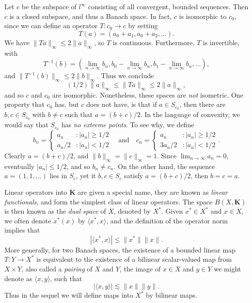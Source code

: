 \begin{example}
    Let $c$ be the subspace of $l^\infty$ consisting of all convergent, bounded sequences. Then $c$ is a closed subspace, and thus a Banach space. In fact, $c$ is isomorphic to $c_0$, since we can define an operator $T: c_0 \to c$ by setting
    \[ T(a) = (a_0 + a_1,a_0 + a_2,\dots). \]
    We have $\| T a \|_\infty \leq 2 \| a \|_\infty$, so $T$ is continuous. Furthermore, $T$ is invertible, with
    \[ T^{-1}(b) = \left( \lim_{n \to \infty} b_n, b_0 - \lim_{n \to \infty} b_n, b_1 - \lim_{n \to \infty} b_n, \dots \right), \]
    and $\| T^{-1}(b) \|_\infty \leq 2 \| b \|_\infty$. Thus we conclude
    \[ (1/2) \| a \|_\infty \leq \| Ta \|_\infty \leq 2 \| a \|_\infty, \]
    and so $c$ and $c_0$ are isomorphic. Nonetheless, these spaces are \emph{not} isometric. One property that $c_0$ has, but $c$ does not have, is that if $a \in S_{c_0}$, then there are $b, c \in S_{c_0}$ with $b \neq c$ such that $a = (b + c)/2$. In the language of convexity, we would say that $S_{c_0}$ has {\it no extreme points}. To see why, we define
    \[ b_n = \begin{cases} a_n &: |a_n| \geq 1/2 \\ a_n/2 &: |a_n| < 1/2 \end{cases}\quad\text{and}\quad c_n = \begin{cases} a_n &: |a_n| \geq 1/2 \\ 3a_n/2 &: |a_n| < 1/2 \end{cases}. \]
    Clearly $a = (b+c)/2$, and $\| b \|_\infty = \| c \|_\infty = 1$. Since $\lim_{n \to \infty} a_n = 0$, eventually $|a_n| \leq 1/2$, and so $b_n \neq c_n$. On the other hand, the sequence $a = (1,1,\dots)$ lies in $S_c$, yet it $b,c \in S_c$ satisfy $a = (b + c)/2$, then $b = c = a$.
\end{example}

Linear operators into $\mathbf{K}$ are given a special name, they are known as \emph{linear functionals}, and form the simplest class of linear operators. The space $B(X,\mathbf{K})$ is then known as the {\it dual space} of $X$, denoted by $X^*$. Given $x^* \in X^*$ and $x \in X$, we often denote $x^*(x)$ by $\langle x^*, x \rangle$, and the definition of the operator norm implies that
%
\[ |\langle x^*, x \rangle| \leq \| x^* \| \| x \|. \]
%
More generally, for two Banach spaces, the existence of a bounded linear map $T: Y \to X^*$ is equivalent to the existence of a bilinear scalar-valued map from $X \times Y$, also called a \emph{pairing} of $X$ and $Y$, the image of $x \in X$ and $y \in Y$ we might denote as $\langle x, y \rangle$, such that
%
\[ |\langle x, y \rangle| \lesssim \| x \| \| y \|. \]
%
Thus in the sequel we will define maps into $X^*$ by bilinear maps.

